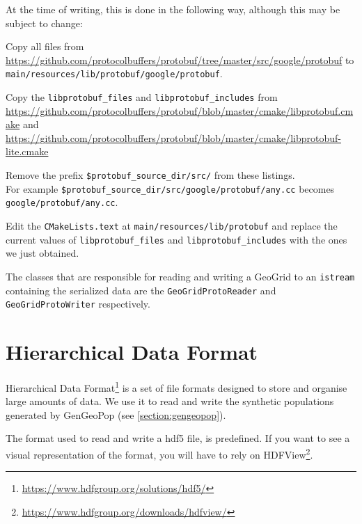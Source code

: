 At the time of writing, this is done in the following way, although this may be subject to change:
\begin{compactitem}
    \item Copy all files from \url{https://github.com/protocolbuffers/protobuf/tree/master/src/google/protobuf} to \texttt{main/resources/lib/protobuf/google/protobuf}.
    \item Copy the \texttt{libprotobuf\_files} and \texttt{libprotobuf\_includes} from \url{https://github.com/protocolbuffers/protobuf/blob/master/cmake/libprotobuf.cmake} and \url{https://github.com/protocolbuffers/protobuf/blob/master/cmake/libprotobuf-lite.cmake}
    \item Remove the prefix \texttt{\${protobuf\_source\_dir}/src/} from these listings.\\
        For example \texttt{\${protobuf\_source\_dir}/src/google/protobuf/any.cc} becomes \texttt{google/protobuf/any.cc}.
    \item Edit the \texttt{CMakeLists.text} at \texttt{main/resources/lib/protobuf} and replace the current values of \texttt{libprotobuf\_files} and \texttt{libprotobuf\_includes} with the ones we just obtained.
\end{compactitem}
The classes that are responsible for reading and writing a GeoGrid to an \texttt{istream} containing the serialized data are the \texttt{GeoGridProtoReader} and \texttt{GeoGridProtoWriter} respectively.


\section{Hierarchical Data Format}
\label{section:hdf5}

Hierarchical Data Format\footnote{\url{https://www.hdfgroup.org/solutions/hdf5/}} is a set of file formats designed to store and organise large amounts of data. We use it to read and write the synthetic populations generated by GenGeoPop (see \ref{section:gengeopop}).

The format used to read and write a hdf5 file, is predefined. If you want to see a visual representation of the format, you will have to rely on HDFView\footnote{\url{https://www.hdfgroup.org/downloads/hdfview/}}. 